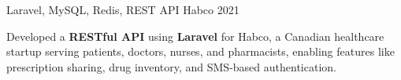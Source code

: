\begin{cventries}
    
  \cventry
    {Laravel, MySQL, Redis, REST API} %
    {Habco} %
    {} %
    {2021} %
    {
      \begin{cvitems} %
      	\item {Developed a \textbf{RESTful API} using \textbf{Laravel} for Habco, a Canadian healthcare startup serving patients, doctors, nurses, and pharmacists, enabling features like prescription sharing, drug inventory, and SMS-based authentication.}
      \end{cvitems}
    }




\end{cventries}
